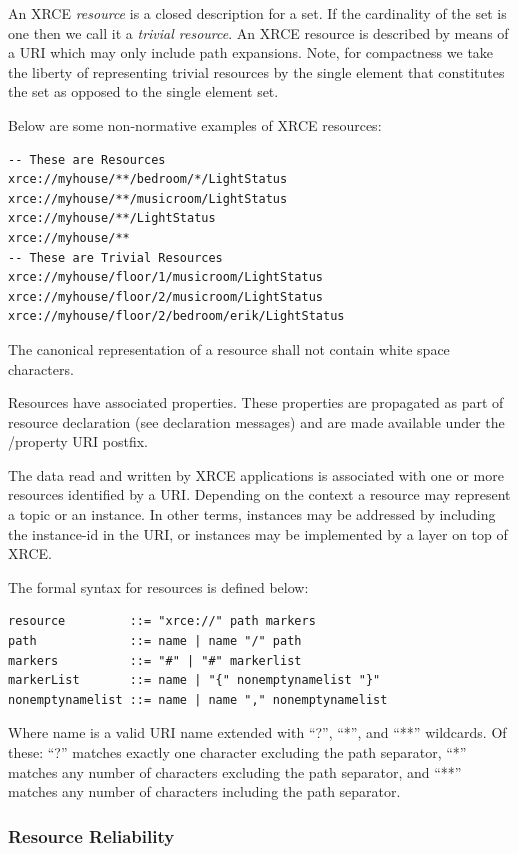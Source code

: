 \documentclass[a4paper,oneside,article]{memoir}
\begin{document}
An XRCE \emph{resource} is a closed description for a set.  If the cardinality of the set is one
then we call it a \emph{trivial resource}.  An XRCE resource is described by means of a URI which
may only include path expansions.  Note, for compactness we take the liberty of representing trivial
resources by the single element that constitutes the set as opposed to the single element set.

Below are some non-normative examples of XRCE resources:
\begin{verbatim}
-- These are Resources
xrce://myhouse/**/bedroom/*/LightStatus 
xrce://myhouse/**/musicroom/LightStatus
xrce://myhouse/**/LightStatus
xrce://myhouse/**
-- These are Trivial Resources
xrce://myhouse/floor/1/musicroom/LightStatus
xrce://myhouse/floor/2/musicroom/LightStatus
xrce://myhouse/floor/2/bedroom/erik/LightStatus
\end{verbatim}

The canonical representation of a resource shall not contain white space characters.

Resources have associated properties.  These properties are propagated as part of resource
declaration (see declaration messages) and are made available under the /property URI postfix.

The data read and written by XRCE applications is associated with one or more resources identified
by a URI.  Depending on the context a resource may represent a topic or an instance.  In other
terms, instances may be addressed by including the instance-id in the URI, or instances may be
implemented by a layer on top of XRCE.

The formal syntax for resources is defined below:
\begin{verbatim}
resource         ::= "xrce://" path markers
path             ::= name | name "/" path 
markers          ::= "#" | "#" markerlist
markerList       ::= name | "{" nonemptynamelist "}"
nonemptynamelist ::= name | name "," nonemptynamelist
\end{verbatim}

Where name is a valid URI name extended with ``?'', ``*'', and ``**'' wildcards.  Of these: ``?''
matches exactly one character excluding the path separator, ``*'' matches any number of characters
excluding the path separator, and ``**'' matches any number of characters including the path
separator.

\subsubsection{Resource Reliability}
\end{document}
